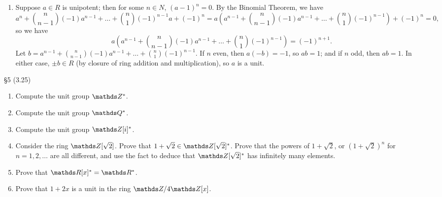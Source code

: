 \documentclass{homework}
\begin{document}
\begin{solution}
\begin{enumerate}[label=(\alph*)]
    \item Suppose $a\in R$ is unipotent; then for some $n\in N$, $(a-1)^n=0$. By the Binomial
      Theorem, we have \[
        a^n+\binom{n}{n-1}(-1)a^{n-1}+\ldots+\binom{n}{1}(-1)^{n-1}a+(-1)^n=
        a\left(a^{n-1}+\binom{n}{n-1}(-1)a^{n-1}+\ldots+\binom{n}{1}(-1)^{n-1}\right) + (-1)^n=0
      ,\] so we have \[
      a(a^{n-1}+\binom{n}{n-1}(-1)a^{n-1}+\ldots+\binom{n}{1}(-1)^{n-1}) = (-1)^{n+1}
      .\] Let $b=a^{n-1}+\binom{n}{n-1}(-1)a^{n-1}+\ldots+\binom{n}{1}(-1)^{n-1}$. If $n$ even, then
      $a(-b)=-1$, so $ab=1$; and if $n$ odd, then $ab=1$. In either case, $\pm b\in R$ (by closure
      of ring addition and multiplication), so $a$ is a unit.
  \end{enumerate}
\end{solution}



\begin{problem}{\S 5}
  (3.25)
  \begin{enumerate}[label=(\alph*)]
    \item Compute the unit group $\Z^*$.
    \item Compute the unit group $\Q^*$.
    \item Compute the unit group $\Z[i]^*$.
    \item Consider the ring $\Z[\sqrt{2}]$. Prove that $1+\sqrt{2}\in \Z[\sqrt{2}]^*$. Prove that
      the powers of $1+\sqrt{2}$, or $(1+\sqrt{2})^n$ for $n=1,2,\ldots$ are all different, and use
      the fact to deduce that $\Z[\sqrt{2}]^*$ has infinitely many elements.
    \item Prove that $\R[x]^*=\R^*$.
    \item Prove that $1+2x$ is a unit in the ring $\Z / 4\Z[x]$.
  \end{enumerate}
\end{problem}
\end{document}
